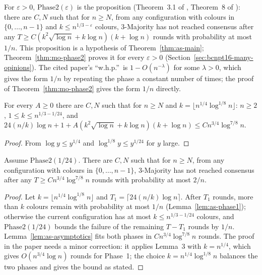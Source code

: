 \begin{definition}\label{def:as-phase2}
\leanok{}
For $\varepsilon>0$, $\mathrm{Phase2}(\varepsilon)$ is the proposition (Theorem~3.1 of
\cite{BCNPT16}, Theorem~8 of \cite{BCEKMN17}): there are $C,N$ such that for $n\ge N$, from any
configuration with colours in $\{0,\dots,n-1\}$ and $k\le n^{1/3-\varepsilon}$ colours,
3-Majority has not reached consensus after any
$T\ge C(k^2\sqrt{\log n}+k\log n)(k+\log n)$ rounds with probability at most $1/n$.
This proposition is a hypothesis of Theorem~\ref{thm:as-main}; Theorem~\ref{thm:mo-phase2}
proves it for every $\varepsilon>0$ (Section~\ref{sec:bcnpt16-many-opinions}). The cited paper's
``w.h.p.''\ is $1-O(n^{-\lambda})$ for some $\lambda>0$, which gives the form $1/n$ by repeating
the phase a constant number of times; the proof of Theorem~\ref{thm:mo-phase2} gives the form
$1/n$ directly.
\end{definition}

\begin{lemma}\label{lem:as-asymptotics}
\leanok
For every $A\ge0$ there are $C,N$ such that for $n\ge N$ and
$k=\lfloor n^{1/4}\log^{1/8}n\rfloor$: $n\ge2$, $1\le k\le n^{1/3-1/24}$, and
$24(n/k)\log n+1+A(k^2\sqrt{\log n}+k\log n)(k+\log n)\le Cn^{3/4}\log^{7/8}n$.
\end{lemma}
\begin{proof}\leanok
From $\log y\le y^{1/4}$ and $\log^{1/8}y\le y^{1/24}$ for $y$ large.
\end{proof}

\begin{theorem}\label{thm:as-main}
\leanok
{}
Assume $\mathrm{Phase2}(1/24)$. There are $C,N$ such that for $n\ge N$, from any configuration
with colours in $\{0,\dots,n-1\}$, 3-Majority has not reached consensus after any
$T\ge Cn^{3/4}\log^{7/8}n$ rounds with probability at most $2/n$.
\end{theorem}
\begin{proof}\leanok
Let $k=\lfloor n^{1/4}\log^{1/8}n\rfloor$ and $T_1=\lceil24(n/k)\log n\rceil$. After $T_1$ rounds,
more than $k$ colours remain with probability at most $1/n$ (Lemma~\ref{lem:as-phase1});
otherwise the current configuration has at most $k\le n^{1/3-1/24}$ colours, and
$\mathrm{Phase2}(1/24)$ bounds the failure of the remaining $T-T_1$ rounds by $1/n$.
Lemma~\ref{lem:as-asymptotics} fits both phases in $Cn^{3/4}\log^{7/8}n$ rounds. The proof in the
paper needs a minor correction: it applies Lemma~3 with $k=n^{1/4}$, which gives
$O(n^{3/4}\log n)$ rounds for Phase~1; the choice $k=n^{1/4}\log^{1/8}n$ balances the two phases
and gives the bound as stated.
\end{proof}

